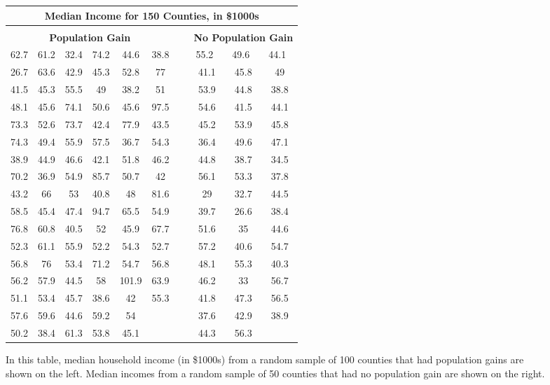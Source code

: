 \newcommand{\npgpad}[1]{\hspace{2mm}#1\hspace{1.5mm}\ }
\begin{figure}
\centering
\begin{tabular}{ ccc ccc c ccc }
\multicolumn{10}{c}{\bf Median Income for 150 Counties,
    in \$1000s} \\
\hline
\vspace{-2mm} \\
\multicolumn{6}{c}{\bf Population Gain} &\hspace{5mm}\ &
    \multicolumn{3}{c}{\bf No Population Gain} \\ 
  \cline{1-6} \cline{8-10}
62.7 & 61.2 & 32.4 & 74.2 & 44.6 & 38.8 &&
    \npgpad{55.2}& \npgpad{49.6}& \npgpad{44.1}\\
26.7 & 63.6 & 42.9 & 45.3 & 52.8 & 77 && 41.1 & 45.8 & 49 \\
41.5 & 45.3 & 55.5 & 49 & 38.2 & 51 && 53.9 & 44.8 & 38.8 \\
48.1 & 45.6 & 74.1 & 50.6 & 45.6 & 97.5 && 54.6 & 41.5 & 44.1 \\
73.3 & 52.6 & 73.7 & 42.4 & 77.9 & 43.5 && 45.2 & 53.9 & 45.8 \\
74.3 & 49.4 & 55.9 & 57.5 & 36.7 & 54.3 && 36.4 & 49.6 & 47.1 \\
38.9 & 44.9 & 46.6 & 42.1 & 51.8 & 46.2 && 44.8 & 38.7 & 34.5 \\
70.2 & 36.9 & 54.9 & 85.7 & 50.7 & 42 && 56.1 & 53.3 & 37.8 \\
43.2 & 66 & 53 & 40.8 & 48 & 81.6 && 29 & 32.7 & 44.5 \\
58.5 & 45.4 & 47.4 & 94.7 & 65.5 & 54.9 && 39.7 & 26.6 & 38.4 \\
76.8 & 60.8 & 40.5 & 52 & 45.9 & 67.7 && 51.6 & 35 & 44.6 \\
52.3 & 61.1 & 55.9 & 52.2 & 54.3 & 52.7 && 57.2 & 40.6 & 54.7 \\
56.8 & 76 & 53.4 & 71.2 & 54.7 & 56.8 && 48.1 & 55.3 & 40.3 \\
56.2 & 57.9 & 44.5 & 58 & 101.9 & 63.9 && 46.2 & 33 & 56.7 \\
51.1 & 53.4 & 45.7 & 38.6 & 42 & 55.3 && 41.8 & 47.3 & 56.5 \\
57.6 & 59.6 & 44.6 & 59.2 & 54 &  && 37.6 & 42.9 & 38.9 \\
50.2 & 38.4 & 61.3 & 53.8 & 45.1 &  && 44.3 & 56.3 &  \\
\cline{1-6} \cline{8-10}
\end{tabular}
\caption{In this table, median household income (in \$1000s)
    from a random sample of 100 counties that had population
    gains are shown on the left.
    Median incomes from a random sample of 50 counties that
    had no population gain are shown on the right.}
\label{countyIncomeSplitByPopGainTable}
\end{figure}

